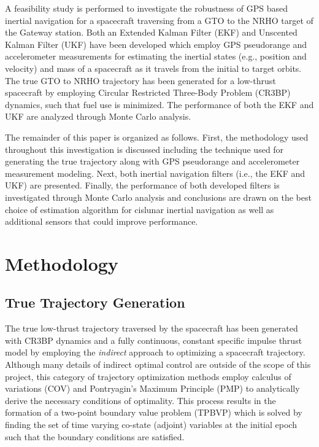 \documentclass[letterpaper, paper,11pt]{AAS}		%
\begin{document}
A feasibility study is performed to investigate the robustness of GPS based inertial navigation for a spacecraft traversing from a GTO to the NRHO target of the Gateway station. Both an Extended Kalman Filter (EKF) and Unscented Kalman Filter (UKF) have been developed which employ GPS pseudorange and accelerometer measurements for estimating the inertial states (e.g., position and velocity) and mass of a spacecraft as it travels from the initial to target orbits. The true GTO to NRHO trajectory has been generated for a low-thrust spacecraft by employing Circular Restricted Three-Body Problem (CR3BP) dynamics, such that fuel use is minimized. The performance of both the EKF and UKF are analyzed through Monte Carlo analysis.

The remainder of this paper is organized as follows. First, the methodology used throughout this investigation is discussed including the technique used for generating the true trajectory along with GPS pseudorange and accelerometer measurement modeling. Next, both inertial navigation filters (i.e., the EKF and UKF) are presented. Finally, the performance of both developed filters is investigated through Monte Carlo analysis and conclusions are drawn on the best choice of estimation algorithm for cislunar inertial navigation as well as additional sensors that could improve performance. 


\section{Methodology} 
\subsection{True Trajectory Generation}
The true low-thrust trajectory traversed by the spacecraft has been generated with CR3BP dynamics and a fully continuous, constant specific impulse thrust model by employing the \textit{indirect} approach to optimizing a spacecraft trajectory. Although many details of indirect optimal control are outside of the scope of this project, this category of trajectory optimization methods employ calculus of variations (COV) and Pontryagin's Maximum Principle (PMP) to analytically derive the necessary conditions of optimality. This process results in the formation of a two-point boundary value problem (TPBVP) which is solved by finding the set of time varying co-state (adjoint) variables at the initial epoch such that the boundary conditions are satisfied. 
\end{document}
